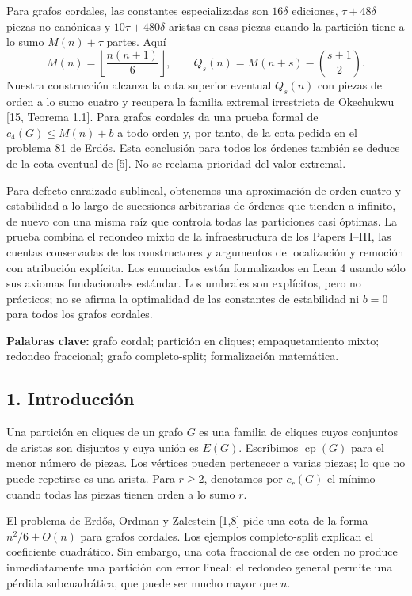 \documentclass[spanish,11pt,a4paper]{article}
\begin{document}
Para grafos cordales, las constantes especializadas son \(16\delta\) ediciones, \(\tau+48\delta\) piezas no canónicas y \(10\tau+480\delta\) aristas en esas piezas cuando la partición tiene a lo sumo \(M(n)+\tau\) partes. Aquí \[
M(n)=\left\lfloor\frac{n(n+1)}6\right\rfloor,\qquad
Q_s(n)=M(n+s)-\binom{s+1}{2}.
\] Nuestra construcción alcanza la cota superior eventual \(Q_s(n)\) con piezas de orden a lo sumo cuatro y recupera la familia extremal irrestricta de Okechukwu {[}15, Teorema 1.1{]}. Para grafos cordales da una prueba formal de \(c_4(G)\le M(n)+b\) a todo orden y, por tanto, de la cota pedida en el problema 81 de Erdős. Esta conclusión para todos los órdenes también se deduce de la cota eventual de {[}5{]}. No se reclama prioridad del valor extremal.

Para defecto enraizado sublineal, obtenemos una aproximación de orden cuatro y estabilidad a lo largo de sucesiones arbitrarias de órdenes que tienden a infinito, de nuevo con una misma raíz que controla todas las particiones casi óptimas. La prueba combina el redondeo mixto de la infraestructura de los Papers I--III, las cuentas conservadas de los constructores y argumentos de localización y remoción con atribución explícita. Los enunciados están formalizados en Lean 4 usando sólo sus axiomas fundacionales estándar. Los umbrales son explícitos, pero no prácticos; no se afirma la optimalidad de las constantes de estabilidad ni \(b=0\) para todos los grafos cordales.

\textbf{Palabras clave:} grafo cordal; partición en cliques; empaquetamiento mixto; redondeo fraccional; grafo completo-split; formalización matemática.

\subsection{1. Introducción}\label{introduccion}

Una partición en cliques de un grafo \(G\) es una familia de cliques cuyos conjuntos de aristas son disjuntos y cuya unión es \(E(G)\). Escribimos \(\operatorname{cp}(G)\) para el menor número de piezas. Los vértices pueden pertenecer a varias piezas; lo que no puede repetirse es una arista. Para \(r\ge2\), denotamos por \(c_r(G)\) el mínimo cuando todas las piezas tienen orden a lo sumo \(r\).

El problema de Erdős, Ordman y Zalcstein {[}1,8{]} pide una cota de la forma \(n^2/6+O(n)\) para grafos cordales. Los ejemplos completo-split explican el coeficiente cuadrático. Sin embargo, una cota fraccional de ese orden no produce inmediatamente una partición con error lineal: el redondeo general permite una pérdida subcuadrática, que puede ser mucho mayor que \(n\).
\end{document}
